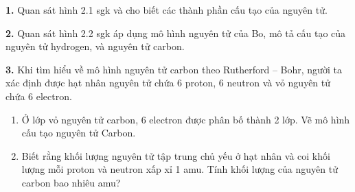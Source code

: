 \documentclass[13pt,a4paper]{article}
\begin{document}
\textbf{1.} Quan sát hình 2.1 sgk và cho biết các thành phần cấu tạo của nguyên tử.
\par\vspace{1pt}\noindent\dotfill\par\vspace{4pt}\noindent\dotfill\par\vspace{4pt}\noindent\dotfill\par\vspace{4pt}\noindent\dotfill\par\vspace{4pt}\noindent\dotfill\par\vspace{4pt}\noindent
\textbf{2.} Quan sát hình 2.2 sgk áp dụng mô hình nguyên tử của Bo, mô tả cấu tạo của nguyên tử hydrogen, và nguyên tử carbon.
\par\vspace{1pt}\noindent\dotfill\par\vspace{4pt}\noindent\dotfill\par\vspace{4pt}\noindent\dotfill\par\vspace{4pt}\noindent\dotfill\par\vspace{4pt}\noindent\dotfill\par\vspace{4pt}\noindent\dotfill\par\vspace{4pt}\noindent
\textbf{3.} Khi tìm hiểu về mô hình nguyên tử carbon theo Rutherford – Bohr, người ta xác định được hạt nhân nguyên tử chứa 6 proton, 6 neutron và vỏ nguyên tử chứa 6 electron.
\begin{enumerate}[label=\alph*.,leftmargin=1.5cm,itemsep=1pt]
  \item Ở lớp vỏ nguyên tử carbon, 6 electron được phân bố thành 2 lớp. Vẽ mô hình cấu tạo nguyên tử Carbon.
  \item Biết rằng khối lượng nguyên tử tập trung chủ yếu ở hạt nhân và coi khối lượng mỗi proton và neutron xấp xỉ 1 amu. Tính khối lượng của nguyên tử carbon bao nhiêu amu?
\end{enumerate}
\end{document}
